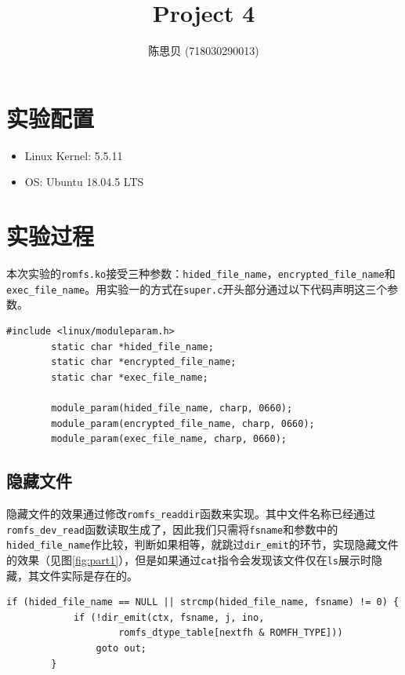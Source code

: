 \documentclass[UTF8]{ctexrep}
\title{
    \horrule{0.5pt} \\[0.4cm]
    \huge Project 4 \\
    \horrule{2pt}
}
\author{
    陈思贝 (718030290013)
}
\date{
}
\begin{document}
    \maketitle

    \section{实验配置}

    \begin{itemize}
        \item Linux Kernel: 5.5.11
        \item OS: Ubuntu 18.04.5 LTS
    \end{itemize}
    \vspace{.3cm}

    \section{实验过程}
    本次实验的\texttt{romfs.ko}接受三种参数：\texttt{hided\_file\_name}，\texttt{encrypted\_file\_name}和\texttt{exec\_file\_name}。用实验一的方式在\texttt{super.c}开头部分通过以下代码声明这三个参数。

    \begin{lstlisting}[firstnumber=82]
        #include <linux/moduleparam.h>
        static char *hided_file_name;
        static char *encrypted_file_name;
        static char *exec_file_name;

        module_param(hided_file_name, charp, 0660);
        module_param(encrypted_file_name, charp, 0660);
        module_param(exec_file_name, charp, 0660);
    \end{lstlisting}

    \subsection{隐藏文件}

    隐藏文件的效果通过修改\texttt{romfs\_readdir}函数来实现。其中文件名称已经通过\texttt{romfs\_dev\_read}函数读取生成了，因此我们只需将\texttt{fsname}和参数中的\texttt{hided\_file\_name}作比较，判断如果相等，就跳过\texttt{dir\_emit}的环节，实现隐藏文件的效果（见图\ref{fig:part1}），但是如果通过\texttt{cat}指令会发现该文件仅在\texttt{ls}展示时隐藏，其文件实际是存在的。

    \begin{lstlisting}[firstnumber=228]
        if (hided_file_name == NULL || strcmp(hided_file_name, fsname) != 0) {
			if (!dir_emit(ctx, fsname, j, ino,
					romfs_dtype_table[nextfh & ROMFH_TYPE]))
				goto out;
		}
    \end{lstlisting}
\end{document}

